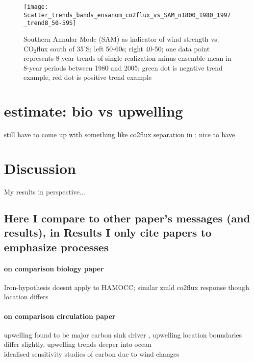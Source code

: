 \documentclass[12pt]{article}
\begin{document}
\begin{figure}[h!]
\centering
		\texttt{[image: Scatter\_trends\_bands\_ensanom\_co2flux\_vs\_SAM\_n1800\_1980\_1997\_trend8\_50-59S]}
		\vspace{-2mm}
		\caption{Southern Annular Mode (SAM) as indicator of wind strength vs. CO$_2$flux south of 35$^\circ$S; left 50-60s; right 40-50; one data point represents 8-year trends of single realization minus ensemble mean in 8-year periods between 1980 and 2005; green dot is negative trend example, red dot is positive trend example}
		\label{fig:scatter}
\end{figure}

\clearpage
\section{estimate: bio vs upwelling}
still have to come up with something like co2flux separation in \citep{Lauderdale2016a}; nice to have

\clearpage

\section{Discussion}

My results in perspective...
\subsection*{Here I compare to other paper's messages (and results), in Results I only cite papers to emphasize processes}

\paragraph{on comparison biology paper} Iron-hypothesis \citep{Martin1990} doesnt apply to HAMOCC; similar zmld co2flux response though location differs \citep{Lovenduski2005,Hauck2013,wang2012} 

\paragraph{on comparison circulation paper} upwelling found to be major carbon sink driver \citep{landschuetzer2015,LeQuere2007,Lovenduski2007}, upwelling location boundaries differ slightly, upwelling trends deeper into ocean \citep{DeVries2017} \\
idealised sensitivity studies of carbon due to wind changes \citep{Lauderdale2013}
\end{document}
